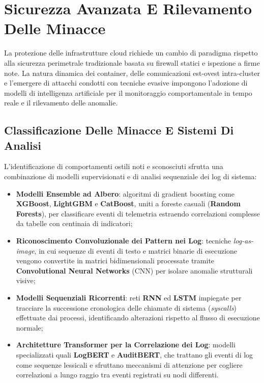 \documentclass[11pt, a4paper]{article}
\begin{document}
\section{Sicurezza Avanzata E Rilevamento Delle Minacce}

La protezione delle infrastrutture cloud richiede un cambio di paradigma rispetto alla sicurezza perimetrale tradizionale basata su firewall statici e ispezione a firme note. La natura dinamica dei container, delle comunicazioni est-ovest intra-cluster e l'emergere di attacchi condotti con tecniche evasive impongono l'adozione di modelli di intelligenza artificiale per il monitoraggio comportamentale in tempo reale e il rilevamento delle anomalie.



\subsection{Classificazione Delle Minacce E Sistemi Di Analisi}

L'identificazione di comportamenti ostili noti e sconosciuti sfrutta una combinazione di modelli supervisionati e di analisi sequenziale dei log di sistema:
\begin{itemize}
    \item \textbf{Modelli Ensemble ad Albero}: algoritmi di gradient boosting come \textbf{XGBoost}, \textbf{LightGBM} e \textbf{CatBoost}, uniti a foreste casuali (\textbf{Random Forests}), per classificare eventi di telemetria estraendo correlazioni complesse da tabelle con centinaia di indicatori;
    \item \textbf{Riconoscimento Convoluzionale dei Pattern nei Log}: tecniche \emph{log-as-image}, in cui sequenze di eventi di testo e matrici binarie di esecuzione vengono convertite in matrici bidimensionali processate tramite \textbf{Convolutional Neural Networks} (CNN) per isolare anomalie strutturali visive;
    \item \textbf{Modelli Sequenziali Ricorrenti}: reti \textbf{RNN} ed \textbf{LSTM} impiegate per tracciare la successione cronologica delle chiamate di sistema (\emph{syscalls}) effettuate dai processi, identificando alterazioni rispetto al flusso di esecuzione normale;
    \item \textbf{Architetture Transformer per la Correlazione dei Log}: modelli specializzati quali \textbf{LogBERT} e \textbf{AuditBERT}, che trattano gli eventi di log come sequenze lessicali e sfruttano meccanismi di attenzione per cogliere correlazioni a lungo raggio tra eventi registrati su nodi differenti.
\end{itemize}
\end{document}
